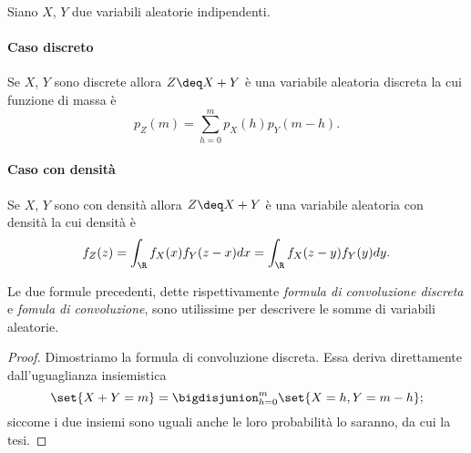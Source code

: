 \begin{proposition}
     Siano $X$, $Y$ due variabili aleatorie indipendenti. 
    \paragraph{Caso discreto} Se $X$, $Y$ sono discrete allora $Z \deq X + Y$ è una variabile aleatoria discreta la cui funzione di massa è \[
        p_Z(m) = \sum_{h = 0}^m p_X(h)p_Y(m-h).    
    \]
    \paragraph{Caso con densità} Se $X$, $Y$ sono con densità allora $Z \deq X + Y$ è una variabile aleatoria con densità la cui densità è \[
        f_Z(z) = \int_{\R} f_X(x)f_Y(z-x)dx = \int_{\R} f_X(z-y)f_Y(y)dy.
    \]
\end{proposition}

Le due formule precedenti, dette rispettivamente \emph{formula di convoluzione discreta} e \emph{fomula di convoluzione}, sono utilissime per descrivere le somme di variabili aleatorie.

\begin{proof}
    Dimostriamo la formula di convoluzione discreta. Essa deriva direttamente dall'uguaglianza insiemistica \[
        \set{X+Y = m} = \bigdisjunion_{h = 0}^m \set{X = h, Y = m-h};    
    \] siccome i due insiemi sono uguali anche le loro probabilità lo saranno, da cui la tesi.
\end{proof}